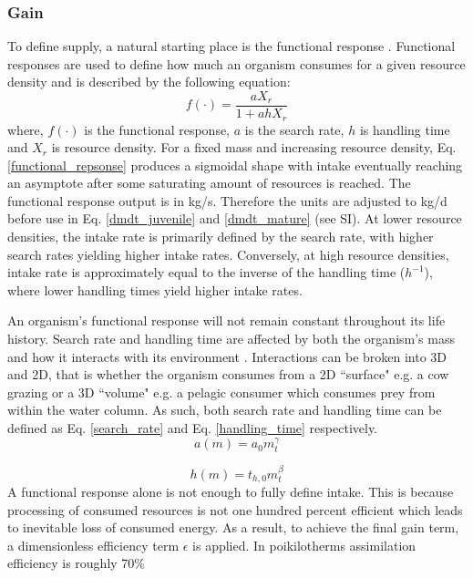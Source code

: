 \documentclass[a4paper, 11pt, hidelinks]{article} %
\begin{document}
	\subsubsection{Gain}
	To define supply, a natural starting place is the functional response \parencite{Holling1959}.  Functional responses  are used to define how much an organism consumes for a given resource density and is described by the following equation:	
	\begin{equation}
		\label{functional_repsonse}
		f(\cdot) = \frac{a X_r}{1 + a h X_r}
	\end{equation}
	where, $ f(\cdot) $ is the functional response, $ a $ is the search rate, $ h $ is handling time and $ X_r $ is resource density.  
	For a fixed mass and increasing resource density, Eq. \ref{functional_repsonse} produces a sigmoidal shape with intake eventually reaching an asymptote after some saturating amount of resources is reached.  The functional response output is in kg/s.  Therefore the units are adjusted to kg/d before use in Eq. \ref{dmdt_juvenile} and \ref{dmdt_mature} (see SI).  At lower resource densities, the intake rate is primarily defined by the search rate, with higher search rates yielding higher intake rates.  Conversely, at high resource densities, intake rate is approximately equal to the inverse of the handling time ($ h^{-1} $), where lower handling times yield higher intake rates.  
	
	An organism's functional response will not remain constant throughout its life history.  Search rate and handling time are affected by both the organism's mass and how it interacts with its environment \parencite{Pawar2012}.  
	Interactions can be broken into 3D and 2D, that is whether the organism consumes from a 2D ``surface" e.g. a cow grazing or a 3D ``volume" e.g. a pelagic consumer which consumes prey from within the water column.  As such, both search rate and handling time can be defined as Eq. \ref{search_rate} and Eq. \ref{handling_time} respectively.
	\begin{equation}
		\label{search_rate}
		a(m) = a_0 m_t^\gamma
	\end{equation}
	
	\begin{equation}
		\label{handling_time}
		h(m) = t_{h,0} m_t^\beta
	\end{equation}
	A functional response alone is not enough to fully define intake.  This is because processing of consumed resources is not one hundred percent efficient which leads to inevitable loss of consumed energy.  As a result, to achieve the final gain term, a dimensionless efficiency term $\epsilon$ is applied.  In poikilotherms assimilation efficiency is roughly 70\% \parencite{Peters1983}
	
\end{document}
